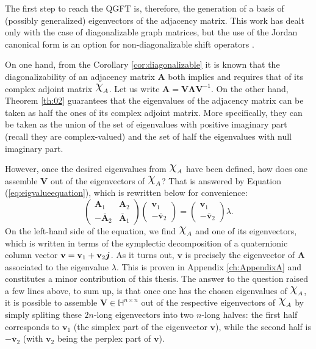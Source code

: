 The first step to reach the QGFT is, therefore, the generation of a basis of (possibly generalized) eigenvectors of the adjacency matrix. This work has dealt only with the case of diagonalizable graph matrices, but the use of the Jordan canonical form is an option for non-diagonalizable shift operators \cite{Longxuan1996}.

On one hand, from the Corollary \ref{cor:diagonalizable} it is known that the diagonalizability of an adjacency matrix $\mathbf{A}$ both implies and requires that of its complex adjoint matrix $\rchi_A$. Let us write $\mathbf{A} = \mathbf{V} \mathbf{\Lambda} \mathbf{V}^{-1}$. On the other hand, Theorem \ref{th:02} guarantees that the eigenvalues of the adjacency matrix can be taken as half the ones of its complex adjoint matrix. More specifically, they can be taken as the union of the set of eigenvalues with positive imaginary part (recall they are complex-valued) and the set of half the eigenvalues with null imaginary part.

However, once the desired eigenvalues from $\rchi_A$ have been defined, how does one assemble $\mathbf{V}$ out of the eigenvectors of $\rchi_A$? That is answered by Equation (\ref{eq:eigvalueequation}), which is rewritten below for convenience:
\begin{equation*}
\begin{pmatrix}
\mathbf{A}_1 & \mathbf{A}_2\\ 
- \overline{\mathbf{A}}_2 & \overline{\mathbf{A}}_1
\end{pmatrix}
\begin{pmatrix}
\mathbf{v}_1 \\ 
- \overline{\mathbf{v}}_2
\end{pmatrix} =
\begin{pmatrix}
\mathbf{v}_1 \\ 
- \overline{\mathbf{v}}_2
\end{pmatrix}
\lambda.
\end{equation*}
On the left-hand side of the equation, we find $\rchi_A$ and one of its eigenvectors, which is written in terms of the symplectic decomposition of a quaternionic column vector $\mathbf{v} = \mathbf{v}_1 + \mathbf{v}_2 \boldsymbol{j}$. As it turns out, $\mathbf{v}$ is precisely the eigenvector of $\mathbf{A}$ associated to the eigenvalue $\lambda$. This is proven in Appendix \ref{ch:AppendixA} and constitutes a minor contribution of this thesis. The answer to the question raised a few lines above, to sum up, is that once one has the chosen eigenvalues of $\rchi_A$, it is possible to assemble $\mathbf{V} \in \mathbb{H}^{n \times n}$ out of the respective eigenvectors of $\rchi_A$ by simply spliting these $2n$-long eigenvectors into two $n$-long halves: the first half corresponds to $\mathbf{v}_1$ (the simplex part of the eigenvector $\mathbf{v}$), while the second half is $- \overline{\mathbf{v}}_2$ (with $\mathbf{v}_2$ being the perplex part of $\mathbf{v}$).

